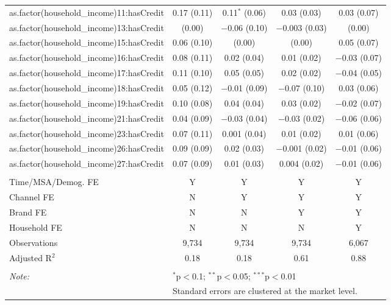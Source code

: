 \begin{table}[!htbp]
\begin{tabular}{@{\extracolsep{5pt}}lcccc}
  as.factor(household\_income)11:hasCredit & 0.17 (0.11) & 0.11$^{*}$ (0.06) & 0.03 (0.03) & 0.03 (0.07) \\ 
  as.factor(household\_income)13:hasCredit &  (0.00) & $-$0.06 (0.10) & $-$0.003 (0.03) &  (0.00) \\ 
  as.factor(household\_income)15:hasCredit & 0.06 (0.10) &  (0.00) &  (0.00) & 0.05 (0.07) \\ 
  as.factor(household\_income)16:hasCredit & 0.08 (0.11) & 0.02 (0.04) & 0.01 (0.02) & $-$0.03 (0.07) \\ 
  as.factor(household\_income)17:hasCredit & 0.11 (0.10) & 0.05 (0.05) & 0.02 (0.02) & $-$0.04 (0.05) \\ 
  as.factor(household\_income)18:hasCredit & 0.05 (0.12) & $-$0.01 (0.09) & $-$0.07 (0.10) & 0.03 (0.06) \\ 
  as.factor(household\_income)19:hasCredit & 0.10 (0.08) & 0.04 (0.04) & 0.03 (0.02) & $-$0.02 (0.07) \\ 
  as.factor(household\_income)21:hasCredit & 0.04 (0.09) & $-$0.03 (0.04) & $-$0.03 (0.02) & $-$0.06 (0.06) \\ 
  as.factor(household\_income)23:hasCredit & 0.07 (0.11) & 0.001 (0.04) & 0.01 (0.02) & 0.01 (0.06) \\ 
  as.factor(household\_income)26:hasCredit & 0.09 (0.09) & 0.02 (0.03) & $-$0.001 (0.02) & $-$0.01 (0.06) \\ 
  as.factor(household\_income)27:hasCredit & 0.07 (0.09) & 0.01 (0.03) & 0.004 (0.02) & $-$0.01 (0.06) \\ 
 \hline \\[-1.8ex] 
Time/MSA/Demog. FE & Y & Y & Y & Y \\ 
Channel FE & N & Y & Y & Y \\ 
Brand FE & N & N & Y & Y \\ 
Household FE & N & N & N & Y \\ 
Observations & 9,734 & 9,734 & 9,734 & 6,067 \\ 
Adjusted R$^{2}$ & 0.18 & 0.18 & 0.61 & 0.88 \\ 
\hline 
\hline \\[-1.8ex] 
\textit{Note:}  & \multicolumn{4}{l}{$^{*}$p$<$0.1; $^{**}$p$<$0.05; $^{***}$p$<$0.01} \\ 
 & \multicolumn{4}{l}{Standard errors are clustered at the market level.} \\ 
\end{tabular} 
\end{table} 
